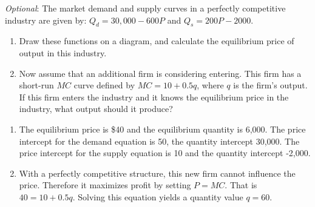 \begin{enumialphparenastyle}
\begin{econex}\label{ex:ch9ex7}
\textit{Optional}: The market demand and supply curves in a perfectly competitive industry are given by: $Q_d=30,000-600P$ and $Q_s=200P-2000$.
\begin{enumerate}
\item	Draw these functions on a diagram, and calculate the equilibrium price of output in this industry.
\item	Now assume that an additional firm is considering entering. This firm has a short-run $MC$ curve defined by $MC=10+0.5q$, where $q$ is the firm's output. If this firm enters the industry and it knows the equilibrium price in the industry, what output should it produce?
\end{enumerate}
\begin{econsolution}
\begin{enumerate}
\item	The equilibrium price is \$40 and the equilibrium quantity is 6,000. The price intercept for the demand equation is 50, the quantity intercept 30,000. The price intercept for the supply equation is 10 and the quantity intercept -2,000.
\item	With a perfectly competitive structure, this new firm cannot influence the price. Therefore it maximizes profit by setting $P=MC$. That is $40=10+0.5q$. Solving this equation yields a quantity value $q=60$.
\end{enumerate}
\end{econsolution}
\end{econex}


\end{enumialphparenastyle}
